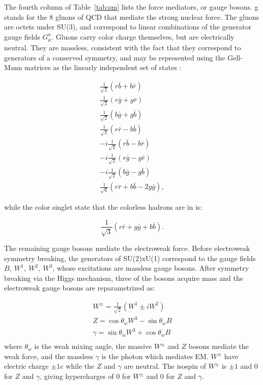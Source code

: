 \indent The fourth column of Table~\ref{tab:sm} lists the force mediators, or gauge bosons. g stands for the 8 gluons of QCD that mediate the strong nuclear force. The gluons are octets under SU(3), and correspond to linear combinations of the generator gauge fields $G^a_\mu$. Gluons carry color charge themselves, but are electrically neutral. They are massless, consistent with the fact that they correspond to generators of a conserved symmetry, and may be represented using the Gell-Mann matrices as the linearly independent set of states \cite{Griffithsqm}:

\begin{equation}
\begin{split}
\frac{1}{\sqrt{2}}(r\bar{b} + b\bar{r}) \\
\frac{1}{\sqrt{2}}(r\bar{g} + g\bar{r}) \\
\frac{1}{\sqrt{2}}(b\bar{g} + g\bar{b}) \\
\frac{1}{\sqrt{2}}(r\bar{r} - b\bar{b}) \\
-i \frac{1}{\sqrt{2}}(r\bar{b} - b\bar{r}) \\
-i \frac{1}{\sqrt{2}}(r\bar{g} - g\bar{r}) \\
-i \frac{1}{\sqrt{2}}(b\bar{g} - g\bar{b}) \\
\frac{1}{\sqrt{6}}(r\bar{r} + b\bar{b} -2g\bar{g}),
\end{split}
\end{equation}

while the color singlet state that the colorless hadrons are in is:

\begin{equation}
\frac{1}{\sqrt{3}}(r\bar{r} + g\bar{g} + b\bar{b}).
\end{equation}

\indent The remaining gauge bosons mediate the electroweak force. Before electroweak symmetry breaking, the generators of SU(2)xU(1) correspond to the gauge fields \\
$B,\  W^1,\  W^2,\  W^3$, whose excitations are massless gauge bosons. After symmetry breaking via the Higgs mechanism, three of the bosons acquire mass and the electroweak gauge bosons are reparametrized as:

\begin{equation}
\begin{split}
W^\pm = \frac{1}{\sqrt{2}}(W^1 \pm iW^2) \\
Z = \cos\theta_w W^3 - \sin\theta_w B \\
\gamma = \sin\theta_w W^3 + \cos\theta_w B \\
\end{split}
\end{equation}
where $\theta_w$ is the weak mixing angle, the massive $W^\pm$ and $Z$ bosons mediate the weak force, and the massless $\gamma$ is the photon which mediates EM. $W^\pm$ have electric charge $\pm 1e$ while the $Z$ and $\gamma$ are neutral. The isospin of $W^\pm$ is $\pm1$ and 0 for $Z$ and $\gamma$, giving hypercharges of $0$ for $W^\pm$ and 0 for $Z$ and $\gamma$. 

